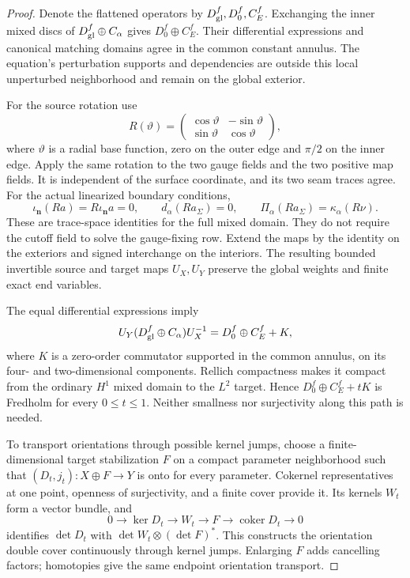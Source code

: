 \documentclass[11pt]{amsart}
\theoremstyle{definition}
\theoremstyle{remark}
\theoremstyle{plain}
\begin{document}
\begin{proof}
Denote the flattened operators by $D_{\rm gl}^f,D_0^f,C_E^f$.
Exchanging the inner mixed discs of $D_{\rm gl}^f\oplus C_\alpha$
gives $D_0^f\oplus C_E^f$. Their differential expressions and
canonical matching domains agree in the common constant annulus.
The equation's perturbation supports and dependencies are outside
this local unperturbed neighborhood and remain on the global exterior.

For the source rotation use
\[
 R(\vartheta)=
 \begin{pmatrix}\cos\vartheta&-\sin\vartheta\\
                 \sin\vartheta&\cos\vartheta\end{pmatrix},
\]
where $\vartheta$ is a radial base function, zero on the outer
edge and $\pi/2$ on the inner edge. Apply the same rotation
to the two gauge fields and the two positive map fields.
It is independent of the surface coordinate, and its two seam
traces agree. For the actual linearized boundary conditions,
\begin{equation}\label{eq:excision-domain-rotation}
 \iota_{\mathbf n}(Ra)=R\iota_{\mathbf n}a=0,\qquad
 d_\alpha(Ra_\Sigma)=0,\qquad
 \Pi_\alpha(Ra_\Sigma)=\kappa_\alpha(R\nu).
\end{equation}
These are trace-space identities for the full mixed domain.
They do not require the cutoff field to solve the gauge-fixing
row. Extend the maps by the identity on the exteriors and
signed interchange on the interiors. The resulting bounded
invertible source and target maps $U_X,U_Y$ preserve the
global weights and finite exact end variables.

The equal differential expressions imply
\begin{equation}\label{eq:excision-commutator-homotopy}
 U_Y(D_{\rm gl}^f\oplus C_\alpha)U_X^{-1}
               =D_0^f\oplus C_E^f+K,
\end{equation}
where $K$ is a zero-order commutator supported in the common
annulus, on its four- and two-dimensional components.
Rellich compactness makes it compact from the ordinary $H^1$
mixed domain to the $L^2$ target. Hence
$D_0^f\oplus C_E^f+tK$ is Fredholm for every $0\leq t\leq1$.
Neither smallness nor surjectivity along this path is needed.

To transport orientations through possible kernel jumps, choose
a finite-dimensional target stabilization $F$ on a compact
parameter neighborhood such that $(D_t,j_t):X\oplus F\to Y$
is onto for every parameter. Cokernel representatives at one
point, openness of surjectivity, and a finite cover provide it.
Its kernels $W_t$ form a vector bundle, and
\[
 0\longrightarrow\ker D_t\longrightarrow W_t\longrightarrow F
   \longrightarrow\operatorname{coker}D_t\longrightarrow0
\]
identifies $\det D_t$ with $\det W_t\otimes(\det F)^*$.
This constructs the orientation double cover continuously
through kernel jumps. Enlarging $F$ adds cancelling factors;
homotopies give the same endpoint orientation transport.


\end{proof}
\end{document}
